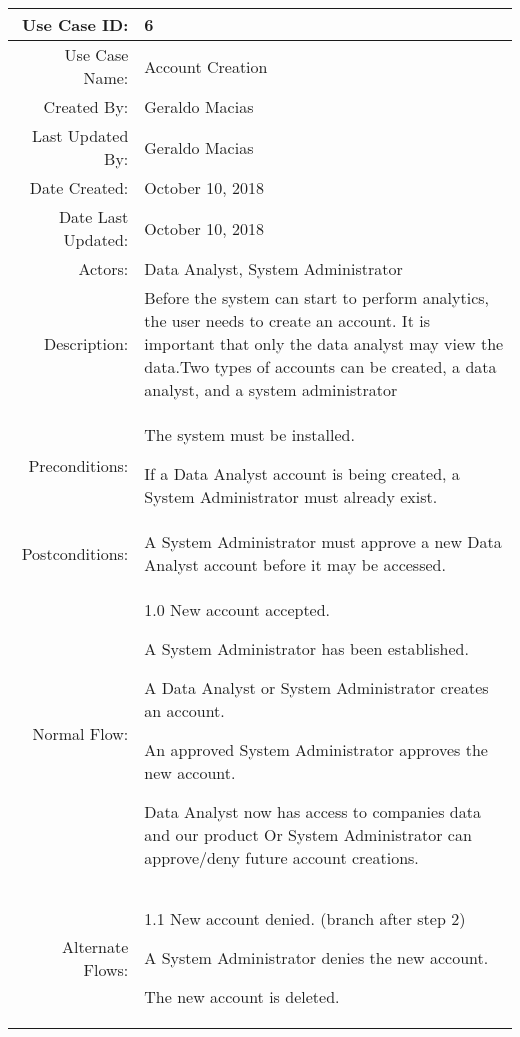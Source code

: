 \documentclass[12pt,oneside,letterpaper]{article}
\newenvironment{packed_enumerate}{ %
\vspace{-7mm}
\begin{enumerate}
  \setlength{\itemsep}{0pt}
  \setlength{\parskip}{0pt}
  \setlength{\parsep}{0pt}
}{\end{enumerate}
\vspace{-8mm}}
\begin{document}
\begin{longtable}{|r|p{3.8in}|}
\hline
Use Case ID:&6\\
\hline
Use Case Name:&Account Creation\\
\hline
Created By:&Geraldo Macias\\
\hline
Last Updated By:&Geraldo Macias\\
\hline
Date Created:&October 10, 2018\\
\hline
Date Last Updated:&October 10, 2018\\
\hline
Actors:&Data Analyst, System Administrator\\
\hline
Description:&Before the system can start to perform analytics, the user needs to create an account. It is important that only the data analyst may view the data.Two types of accounts can be created, a data analyst, and a system administrator\\
\hline
Preconditions:&\begin{packed_enumerate}
\item The system must be installed.
\item If a Data Analyst account is being created, a System Administrator must already exist.
\end{packed_enumerate}\\
\hline
Postconditions:&A System Administrator must approve a new Data Analyst account before it may be accessed.\\
\hline
Normal Flow:&1.0 New account accepted.\newline
\begin{packed_enumerate}
\item A System Administrator has been established.
\item A Data Analyst or System Administrator creates an account.
\item An approved System Administrator approves the new account.
\item Data Analyst now has access to companies data and our product Or System Administrator can approve/deny future account creations.
\end{packed_enumerate}\\
\hline
Alternate Flows:&1.1 New account denied. (branch after step 2)\newline
\begin{packed_enumerate}
\item A System Administrator denies the new account.
\item The new account is deleted.
\end{packed_enumerate}\\

\end{longtable}
\end{document}
